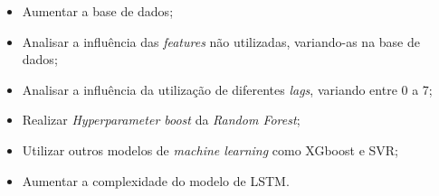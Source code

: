 \documentclass[
  12pt,		%
  a4paper,	%
  openright,%
  oneside,	%
  chapter=TITLE,		%
  section=TITLE,		%
  english,	%
  french,	%
  spanish,	%
  brazil	%
]{abntex2}
\begin{document}
    \begin{itemize}
        \item Aumentar a base de dados;
        \item Analisar a influência das \textit{features} não utilizadas, variando-as na base de dados;
        \item Analisar a influência da utilização de diferentes \textit{lags}, variando entre 0 a 7;
        \item Realizar \textit{Hyperparameter boost} da \textit{Random Forest};
        \item Utilizar outros modelos de \textit{machine learning} como XGboost e SVR;
        \item Aumentar a complexidade do modelo de LSTM.
    \end{itemize}
    
    \postextual
    
    
    
    
    
\end{document}
